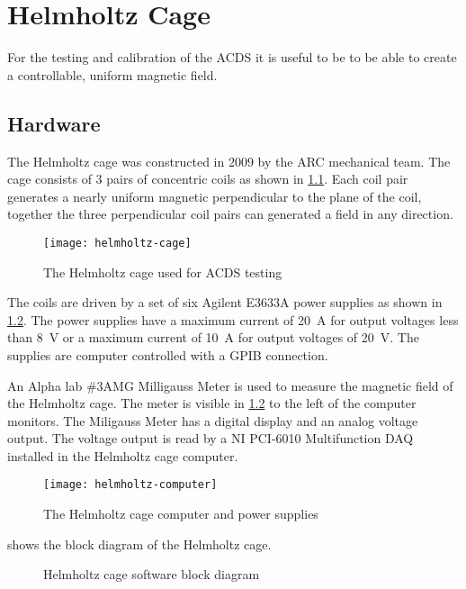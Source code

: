 

\chapter{Helmholtz Cage}

\label{ch:BG}

For the testing and calibration of the \ac{ACDS} it is useful to be to be able to create a controllable, uniform magnetic field.

\section{Hardware}

The Helmholtz cage was constructed in 2009 by the \ac{ARC} mechanical team. The cage consists of 3 pairs of concentric coils as shown in \cref{fig:helmholtz}. Each coil pair generates a nearly uniform magnetic perpendicular to the plane of the coil, together the three perpendicular coil pairs can generated a field in any direction.

\begin{figure}[!ht]
    \texttt{[image: helmholtz-cage]}
    \caption{The Helmholtz cage used for \acs{ACDS} testing}
    \label{fig:helmholtz}
\end{figure}

The coils are driven by a set of six Agilent E3633A power supplies as shown in \cref{fig:helmholtz-comp}. The power supplies have a maximum current of 20~A for output voltages less than 8~V or a maximum current of 10~A for output voltages of 20~V. The supplies are computer controlled with a \ac{GPIB} connection. 

An Alpha lab \#3AMG Milligauss Meter is used to measure the magnetic field of the Helmholtz cage. The meter is visible in \cref{fig:helmholtz-comp} to the left of the computer monitors. The Miligauss Meter has a digital display and an analog voltage output. The voltage output is read by a NI PCI-6010 Multifunction DAQ installed in the Helmholtz cage computer.

\begin{figure}[!ht]
    \texttt{[image: helmholtz-computer]}
    \caption{The Helmholtz cage computer and power supplies}
    \label{fig:helmholtz-comp}
\end{figure}

 shows the block diagram of the Helmholtz cage.

\begin{figure}[!ht]
    \caption{Helmholtz cage software block diagram}
    \label{fig:hc-block}
\end{figure}


